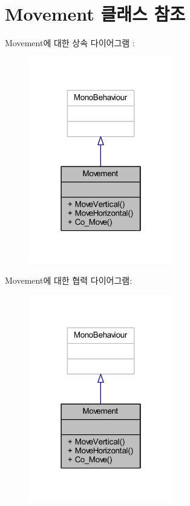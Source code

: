 \hypertarget{class_movement}{}\section{Movement 클래스 참조}
\label{class_movement}


Movement에 대한 상속 다이어그램 \+: \nopagebreak
\begin{figure}[H]
\begin{center}
\leavevmode
\includegraphics[width=178pt]{d8/d54/class_movement__inherit__graph}
\end{center}
\end{figure}


Movement에 대한 협력 다이어그램\+:\nopagebreak
\begin{figure}[H]
\begin{center}
\leavevmode
\includegraphics[width=178pt]{d6/dad/class_movement__coll__graph}
\end{center}
\end{figure}
